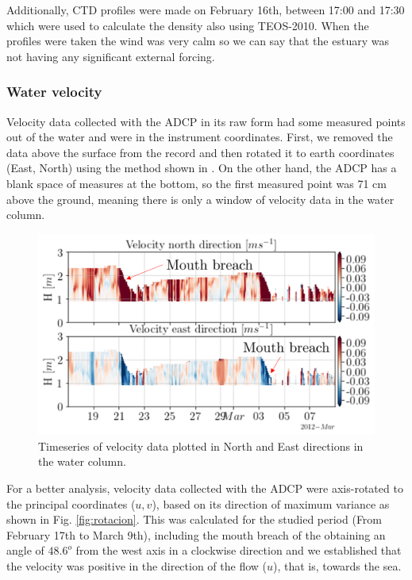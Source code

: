 \documentclass[tesis.tex]{subfiles}
\begin{document}
Additionally, CTD profiles were made on February 16th, between 17:00 and 17:30 which were used to calculate the density also using TEOS-2010. When the profiles were taken the wind was very calm so we can say that the estuary was not having any significant external forcing. \\

\subsubsection{Water velocity} \label{Estuary_currents}

Velocity data collected with the ADCP in its raw form had some measured points out of the water and were in the instrument coordinates. First, we removed the data above the surface from the record and then rotated it to earth coordinates (East, North) using the method shown in \cite{teledyne2008}. On the other hand, the ADCP has a blank space of measures at the bottom, so the first measured point was 71 cm above the ground, meaning there is only a window of velocity data in the water column.\\

\begin{figure}[h!]
    \centering
    \includegraphics[width=\textwidth]{Imagenes/velocity_estnorth.png}
    \caption{Timeseries of velocity data plotted in North and East directions in the water column.}
    \label{fig:north_east}
\end{figure}

For a better analysis, velocity data collected with the ADCP were axis-rotated to the principal coordinates ($u,v$), based on its direction of maximum variance as shown in Fig. \ref{fig:rotacion}. This was calculated for the studied period (From February 17th to March 9th), including the mouth breach of the  obtaining an angle of $48.6^o$ from the west axis in a clockwise direction and we established that the velocity was positive in the direction of the flow ($u$), that is, towards the sea.  
\end{document}

